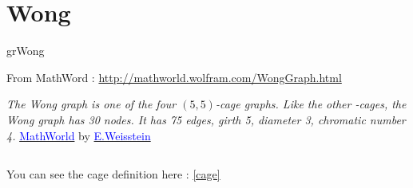\newpage\section{Wong}\label{wong}
\begin{NewMacroBox}{grWong}{}

\medskip
From MathWord : \url{http://mathworld.wolfram.com/WongGraph.html} 

\emph{The Wong graph is one of the four $(5,5)$-cage graphs. Like the other -cages, the Wong graph has 30 nodes. It has 75 edges, girth 5, diameter 3, chromatic number 4.}
\href{http://mathworld.wolfram.com/topics/GraphTheory.html}%
           {\textcolor{blue}{MathWorld}} by \href{http://en.wikipedia.org/wiki/Eric_W._Weisstein}%
           {\textcolor{blue}{E.Weisstein}}   
\end{NewMacroBox}


\subsection{}
You can see the cage definition here : \ref{cage}

\bigskip
\begin{center}
\begin{tkzexample}[vbox]
\end{tkzexample} 
\end{center}


\endinput